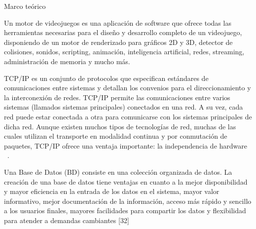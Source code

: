 \begin{thesischapter}{1} {Marco teórico}
    \vspace{10pt}

    \vspace{2pt}
    Un motor de videojuegos es una aplicación de software que ofrece
    todas las herramientas necesarias para el diseño y desarrollo completo de un videojuego, disponiendo
    de un motor de renderizado para gráficos 2D y 3D, detector de colisiones, sonidos, scripting,
    animación, inteligencia artificial, redes, streaming, administración de memoria y mucho más.~\cite{arce2011desarrollo} 
    
    \vspace{10pt}
    TCP/IP es un conjunto de protocolos que especifican estándares de comunicaciones entre sistemas y detallan los convenios 
    para el direccionamiento y la interconexión de redes. TCP/IP permite las comunicaciones entre varios sistemas (llamados 
    sistemas principales) conectados en una red. A su vez, cada red puede estar conectada a otra para comunicarse con los 
    sistemas principales de dicha red. Aunque existen muchos tipos de tecnologías de red, muchas de las cuales utilizan el 
    transporte en modalidad continua y por conmutación de paquetes, TCP/IP ofrece una ventaja importante: la independencia 
    de hardware ~\cite{protocolo-tcp-ip}.

    \vspace{10pt}
    Una Base de Datos (BD) consiste en una colección organizada de datos. La creación de una
    base de datos tiene ventajas en cuanto a la mejor disponibilidad y mayor eficiencia en la
    entrada de los datos en el sistema, mayor valor informativo, mejor documentación de la
    información, acceso más rápido y sencillo a los usuarios finales, mayores facilidades para
    compartir los datos y flexibilidad para atender a demandas cambiantes [32]


\end{thesischapter}
